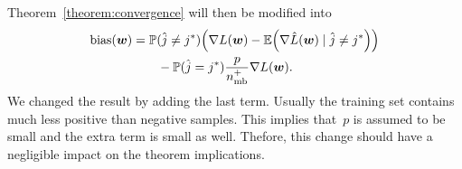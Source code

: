 Theorem~\ref{theorem:convergence} will then be modified into
\begin{equation*}
  \begin{aligned}
    \bias(\bm w)
    & = \PP(\hat j\neq j^*) \Brac{\nabla L(\bm w) - \EE\Brac{\nabla \hat L(\bm w) \mid \hat j\neq j^*}} \\
    & \qquad - \PP(\hat j= j^*)\frac{p}{\nmin^+}\nabla L(\bm w).
  \end{aligned}
\end{equation*}
We changed the result by adding the last term. Usually the training set contains much less positive than negative samples. This implies that~$p$ is assumed to be small and the extra term is small as well. Thefore, this change should have a negligible impact on the theorem implications.
